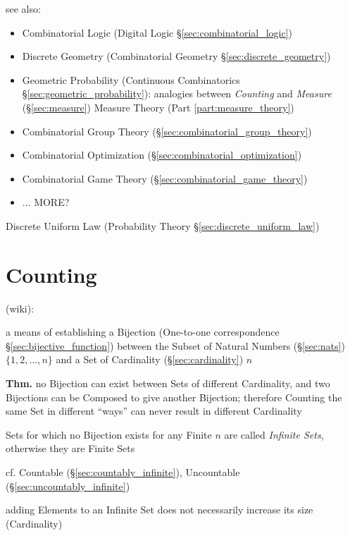 see also:
\begin{itemize}
  \item Combinatorial Logic (Digital Logic \S\ref{sec:combinatorial_logic})
  \item Discrete Geometry (Combinatorial Geometry \S\ref{sec:discrete_geometry})
  \item Geometric Probability (Continuous Combinatorics
    \S\ref{sec:geometric_probability}): analogies between \emph{Counting} and
    \emph{Measure} (\S\ref{sec:measure}) \fist Measure Theory (Part
    \ref{part:measure_theory})
  \item Combinatorial Group Theory (\S\ref{sec:combinatorial_group_theory})
  \item Combinatorial Optimization (\S\ref{sec:combinatorial_optimization})
  \item Combinatorial Game Theory (\S\ref{sec:combinatorial_game_theory})
  \item ... MORE?
\end{itemize}

\fist Discrete Uniform Law (Probability Theory \S\ref{sec:discrete_uniform_law})



\section{Counting}\label{sec:counting}

(wiki):

a means of establishing a Bijection (One-to-one correspondence
\S\ref{sec:bijective_function}) between the Subset of Natural Numbers
(\S\ref{sec:nats}) $\{1, 2, \ldots, n\}$ and a Set of Cardinality
(\S\ref{sec:cardinality}) $n$

\textbf{Thm.} no Bijection can exist between Sets of different Cardinality, and
two Bijections can be Composed to give another Bijection; therefore Counting the
same Set in different ``ways'' can never result in different Cardinality

Sets for which no Bijection exists for any Finite $n$ are called \emph{Infinite
  Sets}, otherwise they are Finite Sets

cf. Countable (\S\ref{sec:countably_infinite}), Uncountable
(\S\ref{sec:uncountably_infinite})

adding Elements to an Infinite Set does not necessarily increase its size
(Cardinality)



